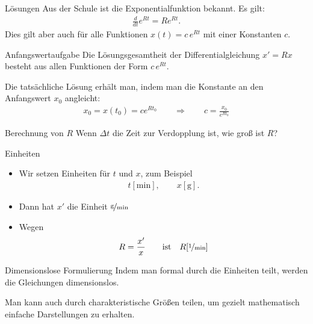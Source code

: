 \begin{frame}{Lösungen}
  Aus der Schule ist die Exponentialfunktion bekannt. Es gilt:
  \begin{gather*}
    \tfrac d{dt} e^{Rt} = R e^{Rt}.
  \end{gather*}
  Dies gilt aber auch für alle Funktionen $x(t) = c \,e^{Rt}$ mit einer Konstanten $c$.

  \begin{block}{Anfangswertaufgabe}
    Die Lösungsgesamtheit der Differentialgleichung $x' = Rx$ besteht
    aus allen Funktionen der Form $c\,e^{Rt}$.

    \vspace{1ex}

    Die tatsächliche Lösung erhält man, indem man die Konstante an den Anfangswert $x_0$ angleicht:
    \begin{gather*}
      x_0 = x(t_0) = c e^{Rt_0} \qquad \Rightarrow \qquad c = \frac{x_0}{e^{R t_0}}
    \end{gather*}
  \end{block}
\end{frame}

\begin{frame}{Berechnung von $R$}
  Wenn $\Delta t$ die Zeit zur Verdopplung ist, wie groß ist $R$?

  \vspace{5cm}
  
\end{frame}

\begin{frame}{Einheiten}
  \begin{minipage}{.5\textwidth}
  \begin{itemize}
  \item Wir setzen Einheiten für $t$ und $x$, zum Beispiel
    \begin{gather*}
      t[\text{min}],\qquad x[\text{g}].
    \end{gather*}
  \item Dann hat $x'$ die Einheit $\nicefrac{\text{g}}{\text{min}}$
  \item Wegen
    \begin{gather*}
      R = \frac{x'}{x} \qquad\text{ist}\quad R[\nicefrac1{\text{min}}]
    \end{gather*}
  \end{itemize}    
  \end{minipage}
  \pause
  \begin{block}{Dimensionslose Formulierung}
    Indem man formal durch die Einheiten teilt, werden die Gleichungen
    dimensionslos.

    \vspace{1ex}

    Man kann auch durch charakteristische Größen teilen, um gezielt
    mathematisch einfache Darstellungen zu erhalten.
  \end{block}
\end{frame}

